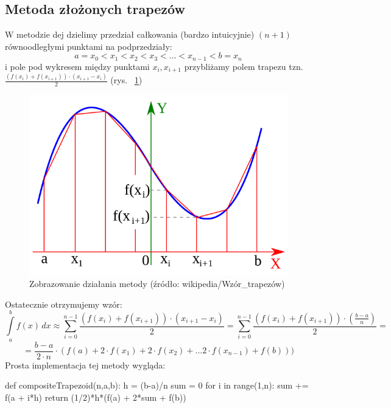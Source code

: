 \documentclass[a4paper]{article}
\begin{document}
\subsection{Metoda złożonych trapezów}
W metodzie dej dzielimy przedział całkowania (bardzo intuicyjnie) $(n+1)$ równoodległymi punktami na podprzedziały:
$$a = x_0 < x_1 < x_2 < x_3 < \ldots < x_{n-1} < b = x_n$$
i pole pod wykresem między punktami $x_i, x_{i+1}$ przybliżamy polem trapezu tzn. $\frac{(f(x_{i}) + f(x_{i+1})) \cdot (x_{i+1} - x_i)}{2}$ (rys. ~\ref{fig:trapez})
\begin{figure}[htbp]{}
\centerline{\includegraphics[scale=.4]{wykres_trapez.png}}
\caption{Zobrazowanie działania metody (źródło: wikipedia/Wzór\_trapezów)}
\label{fig:trapez}
\end{figure}

Ostatecznie otrzymujemy wzór:
$$\int\limits_{a}^{b} f(x)\,dx \approx \sum_{i = 0}^{n - 1}\frac{(f(x_{i}) + f(x_{i+1})) \cdot (x_{i+1} - x_i)}{2} = \sum_{i = 0}^{n - 1}\frac{(f(x_{i}) + f(x_{i+1})) \cdot (\frac{b - a}{n})}{2} = $$
$$= \frac{b - a}{2\cdot n} \cdot (f(a) + 2\cdot f(x_1) + 2\cdot f(x_2) + \ldots 2 \cdot f(x_{n-1}) + f(b)))$$
Prosta implementacja tej metody wygląda:
\begin{python}
def compositeTrapezoid(n,a,b):
    h = (b-a)/n
    sum = 0
    for i in range(1,n):
        sum += f(a + i*h)
    return (1/2)*h*(f(a) + 2*sum + f(b))
\end{python}
\end{document}
